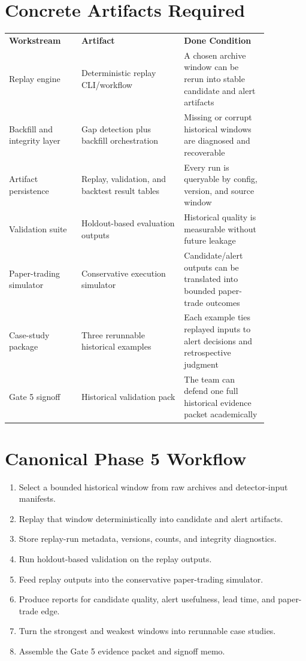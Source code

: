 \documentclass{article}
\begin{document}
\section*{Concrete Artifacts Required}
\begin{longtable}{p{0.24\linewidth}p{0.34\linewidth}p{0.28\linewidth}}
\textbf{Workstream} & \textbf{Artifact} & \textbf{Done Condition} \\
Replay engine & Deterministic replay CLI/workflow & A chosen archive window can be rerun into stable candidate and alert artifacts \\
Backfill and integrity layer & Gap detection plus backfill orchestration & Missing or corrupt historical windows are diagnosed and recoverable \\
Artifact persistence & Replay, validation, and backtest result tables & Every run is queryable by config, version, and source window \\
Validation suite & Holdout-based evaluation outputs & Historical quality is measurable without future leakage \\
Paper-trading simulator & Conservative execution simulator & Candidate/alert outputs can be translated into bounded paper-trade outcomes \\
Case-study package & Three rerunnable historical examples & Each example ties replayed inputs to alert decisions and retrospective judgment \\
Gate 5 signoff & Historical validation pack & The team can defend one full historical evidence packet academically \\
\end{longtable}

\section*{Canonical Phase 5 Workflow}
\begin{enumerate}
\item Select a bounded historical window from raw archives and detector-input manifests.
\item Replay that window deterministically into candidate and alert artifacts.
\item Store replay-run metadata, versions, counts, and integrity diagnostics.
\item Run holdout-based validation on the replay outputs.
\item Feed replay outputs into the conservative paper-trading simulator.
\item Produce reports for candidate quality, alert usefulness, lead time, and paper-trade edge.
\item Turn the strongest and weakest windows into rerunnable case studies.
\item Assemble the Gate 5 evidence packet and signoff memo.
\end{enumerate}
\end{document}
